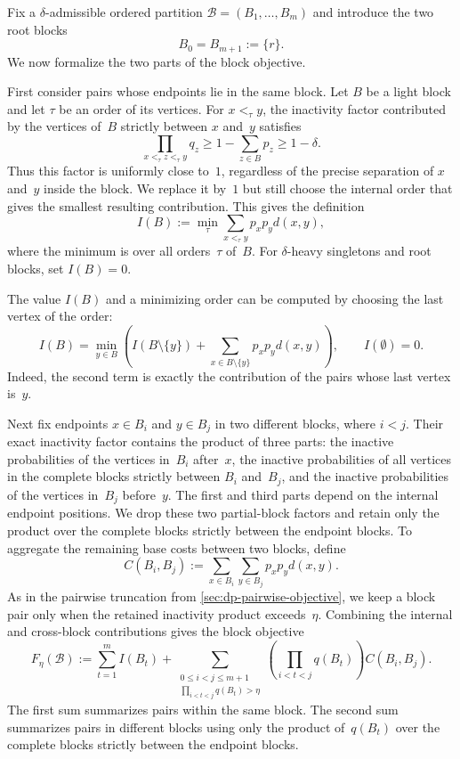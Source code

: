 \documentclass[12pt,a4paper,oneside]{report}
\begin{document}
Fix a $\delta$-admissible ordered partition
$\mathcal B=(B_1,\dots,B_m)$ and introduce the two root blocks
\[
    B_0=B_{m+1}:=\{r\}.
\]
We now formalize the two parts of the block objective.

First consider pairs whose endpoints lie in the same block.
Let $B$ be a light block and let $\tau$ be an order of its vertices.  For
$x<_\tau y$, the inactivity factor contributed by the vertices of~$B$
strictly between $x$ and~$y$ satisfies
\[
    \prod_{x<_\tau z<_\tau y}q_z
    \ge
    1-\sum_{z\in B}p_z
    \ge 1-\delta.
\]
Thus this factor is uniformly close to~$1$, regardless of the precise
separation of $x$ and~$y$ inside the block.  We replace it by~$1$ but still
choose the internal order that gives the smallest resulting contribution.
This gives the definition
\begin{equation}\label{eq:internal-block-cost}
    I(B)
    :=
    \min_{\tau}
    \sum_{x<_\tau y}p_xp_y d(x,y),
\end{equation}
where the minimum is over all orders~$\tau$ of~$B$.  For $\delta$-heavy singletons and
root blocks, set $I(B)=0$.

The value $I(B)$ and a minimizing order can be computed by choosing the last
vertex of the order:
\begin{equation}\label{eq:internal-block-recurrence}
    I(B)
    =
    \min_{y\in B}
    \left(
        I(B\setminus\{y\})
        +\sum_{x\in B\setminus\{y\}}p_xp_y d(x,y)
    \right),
    \qquad I(\emptyset)=0.
\end{equation}
Indeed, the second term is exactly the contribution of the pairs whose last
vertex is~$y$.

Next fix endpoints $x\in B_i$ and $y\in B_j$ in two different blocks, where
$i<j$.  Their exact inactivity factor contains the product of three parts:
the inactive probabilities of the vertices in~$B_i$ after~$x$, the inactive
probabilities of all vertices in the complete blocks strictly between $B_i$
and~$B_j$, and the inactive probabilities of the vertices in~$B_j$ before~$y$.
The first and third parts depend on the internal endpoint positions.  We drop
these two partial-block factors and retain only the product over the complete
blocks strictly between the endpoint blocks.  To aggregate the remaining base
costs between two blocks, define
\[
    C(B_i,B_j)
    :=
    \sum_{x\in B_i}\sum_{y\in B_j}p_xp_y d(x,y).
\]
As in the pairwise truncation from \cref{sec:dp-pairwise-objective}, we keep a block pair only when the retained
inactivity product exceeds~$\eta$.  Combining the internal and cross-block
contributions gives the block objective
\begin{equation}\label{eq:block-objective}
    F_\eta(\mathcal B)
    :=
    \sum_{t=1}^m I(B_t)
    +
    \sum_{\substack{0\le i<j\le m+1\\
                     \prod_{i<t<j}q(B_t)>\eta}}
    \left(\prod_{i<t<j}q(B_t)\right)C(B_i,B_j).
\end{equation}
The first sum summarizes pairs within the same block.  The second sum
summarizes pairs in different blocks using only the product of~$q(B_t)$ over
the complete blocks strictly between the endpoint blocks.
\end{document}
